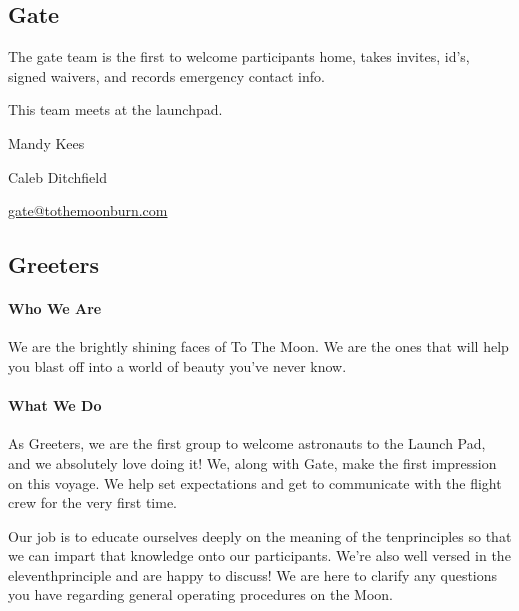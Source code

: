 \begin{multicols}{2}

\subsection*{Gate}
The \gls{gate} team is the first to welcome participants home, takes invites, id's, signed waivers, and records emergency contact info.

This team meets at the \gls{launchpad}.

\begin{description}[leftmargin=6em,noitemsep,style=nextline]
   \item[Lead:] Mandy Kees
   \item[Co-leads:] Caleb Ditchfield
   \item[Contact:] \url{gate@tothemoonburn.com}
\end{description}


\subsection*{Greeters}

\paragraph{Who We Are}
We are the brightly shining faces of To The Moon.  We are the ones that will help you blast off into a world of beauty you’ve never know.

\paragraph{What We Do}

As Greeters, we are the first group to welcome astronauts to the Launch Pad, and we absolutely love doing it!  We, along with Gate, make the first impression on this voyage.  We help set expectations and get to communicate with the flight crew for the very first time. 

Our job is to educate ourselves deeply on the meaning of the \gls{tenprinciples} so that we can impart that knowledge onto our participants.  We're also well versed in the \gls{eleventhprinciple} and are happy to discuss!  We are here to clarify any questions you have regarding general operating procedures on the Moon. 


\end{multicols}
